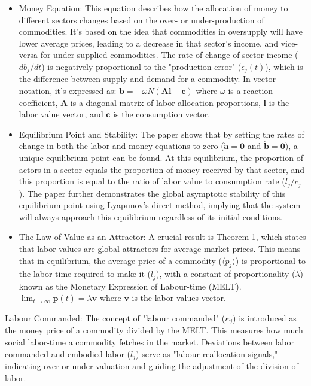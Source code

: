 \begin{itemize}
\item Money Equation: This equation describes how the allocation of money to different sectors changes based on the over- or under-production of commodities. It's based on the idea that commodities in oversupply will have lower average prices, leading to a decrease in that sector's income, and vice-versa for under-supplied commodities. The rate of change of sector income ($d b_j / dt$) is negatively proportional to the "production error" ($\epsilon_j(t)$), which is the difference between supply and demand for a commodity. In vector notation, it's expressed as: $\dot{\mathbf{b}} = -\omega N(\mathbf{A}\mathbf{l} - \mathbf{c})$ where $\omega$ is a reaction coefficient, $\mathbf{A}$ is a diagonal matrix of labor allocation proportions, $\mathbf{l}$ is the labor value vector, and $\mathbf{c}$ is the consumption vector.
\item Equilibrium Point and Stability: The paper shows that by setting the rates of change in both the labor and money equations to zero ($\dot{\mathbf{a}} = \mathbf{0}$ and $\dot{\mathbf{b}} = \mathbf{0}$), a unique equilibrium point can be found. At this equilibrium, the proportion of actors in a sector equals the proportion of money received by that sector, and this proportion is equal to the ratio of labor value to consumption rate ($l_j/c_j$). The paper further demonstrates the global asymptotic stability of this equilibrium point using Lyapunov's direct method, implying that the system will always approach this equilibrium regardless of its initial conditions.
\item  The Law of Value as an Attractor: A crucial result is Theorem 1, which states that labor values are global attractors for average market prices. This means that in equilibrium, the average price of a commodity ($\langle p_j \rangle$) is proportional to the labor-time required to make it ($l_j$), with a constant of proportionality ($\lambda$) known as the Monetary Expression of Labour-time (MELT).  $\lim_{t \to \infty} \mathbf{p}(t) = \lambda \mathbf{v}$ where $\mathbf{v}$ is the labor values vector.
    
\end{itemize}

Labour Commanded: The concept of "labour commanded" ($\kappa_j$) is introduced as the money price of a commodity divided by the MELT. This measures how much social labor-time a commodity fetches in the market. Deviations between labor commanded and embodied labor ($l_j$) serve as "labour reallocation signals," indicating over or under-valuation and guiding the adjustment of the division of labor.

